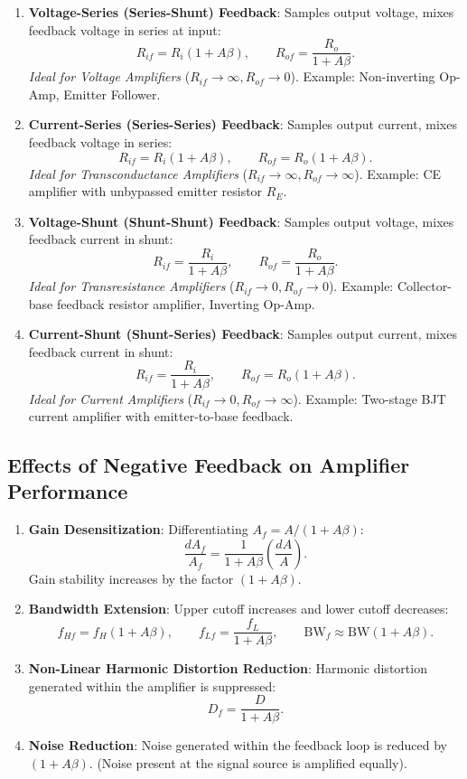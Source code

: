 \documentclass[12pt,a4paper]{article}
\begin{document}
\begin{enumerate}[leftmargin=1.5em, itemsep=3pt]
  \item \textbf{Voltage-Series (Series-Shunt) Feedback}: Samples output voltage, mixes feedback voltage in series at input:
  \[
  R_{if} = R_i (1 + A\beta),\qquad R_{of} = \frac{R_o}{1 + A\beta}.
  \]
  \textit{Ideal for Voltage Amplifiers} ($R_{if} \to \infty, R_{of} \to 0$). Example: Non-inverting Op-Amp, Emitter Follower.
  \item \textbf{Current-Series (Series-Series) Feedback}: Samples output current, mixes feedback voltage in series:
  \[
  R_{if} = R_i (1 + A\beta),\qquad R_{of} = R_o (1 + A\beta).
  \]
  \textit{Ideal for Transconductance Amplifiers} ($R_{if} \to \infty, R_{of} \to \infty$). Example: CE amplifier with unbypassed emitter resistor $R_E$.
  \item \textbf{Voltage-Shunt (Shunt-Shunt) Feedback}: Samples output voltage, mixes feedback current in shunt:
  \[
  R_{if} = \frac{R_i}{1 + A\beta},\qquad R_{of} = \frac{R_o}{1 + A\beta}.
  \]
  \textit{Ideal for Transresistance Amplifiers} ($R_{if} \to 0, R_{of} \to 0$). Example: Collector-base feedback resistor amplifier, Inverting Op-Amp.
  \item \textbf{Current-Shunt (Shunt-Series) Feedback}: Samples output current, mixes feedback current in shunt:
  \[
  R_{if} = \frac{R_i}{1 + A\beta},\qquad R_{of} = R_o (1 + A\beta).
  \]
  \textit{Ideal for Current Amplifiers} ($R_{if} \to 0, R_{of} \to \infty$). Example: Two-stage BJT current amplifier with emitter-to-base feedback.
\end{enumerate}

\subsection{Effects of Negative Feedback on Amplifier Performance}
\begin{tcolorbox}[formulabox, title={Quantitative Benefits of Negative Feedback}]
\begin{enumerate}[leftmargin=1.5em, itemsep=2pt]
  \item \textbf{Gain Desensitization}:
  Differentiating $A_f = A/(1+A\beta)$:
  \[
  \frac{dA_f}{A_f} = \frac{1}{1 + A\beta}\left(\frac{dA}{A}\right).
  \]
  Gain stability increases by the factor $(1+A\beta)$.
  \item \textbf{Bandwidth Extension}:
  Upper cutoff increases and lower cutoff decreases:
  \[
  f_{Hf} = f_H (1 + A\beta),\qquad f_{Lf} = \frac{f_L}{1 + A\beta},\qquad \mathrm{BW}_f \approx \mathrm{BW}(1 + A\beta).
  \]
  \item \textbf{Non-Linear Harmonic Distortion Reduction}:
  Harmonic distortion generated within the amplifier is suppressed:
  \[
  D_f = \frac{D}{1 + A\beta}.
  \]
  \item \textbf{Noise Reduction}: Noise generated within the feedback loop is reduced by $(1+A\beta)$. (Noise present at the signal source is amplified equally).
\end{enumerate}
\end{tcolorbox}
\end{document}
